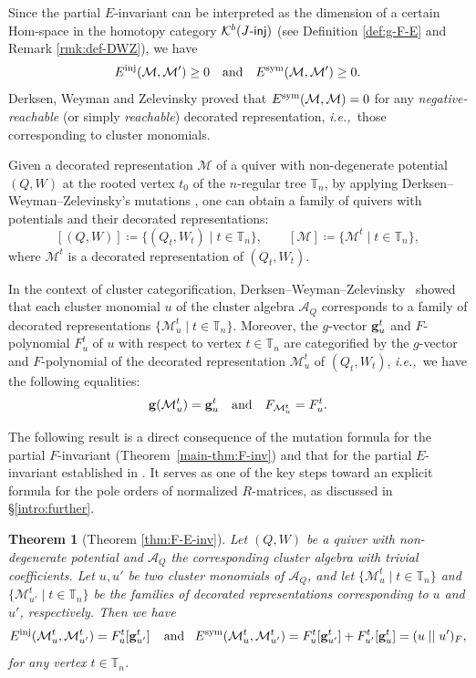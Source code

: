 \documentclass[12pt]{amsart}
\newtheorem{theorem}{Theorem}[section]
\theoremstyle{definition}
\theoremstyle{remark}
\numberwithin{equation}{section}
\newcommand{\ie}{\textit{i.e.,}\ }
\begin{document}
Since the partial $E$-invariant can be interpreted as the dimension of a certain Hom-space in the homotopy category $\mathcal K^{b}(J\mathchar`-\mathsf{inj})$ (see Definition \ref{def:g-F-E} and Remark \ref{rmk:def-DWZ}), we have \[E^{\rm inj}(\mathcal M,\mathcal M')\geq 0\quad \text{and}\quad E^{\rm sym}(\mathcal M,\mathcal M')\geq 0.\]
Derksen, Weyman and Zelevinsky  \cite[Corollary 7.2]{DWZ10} proved that  $E^{\rm sym}(\mathcal M,\mathcal M)=0$ for any {\em negative-reachable} (or simply {\em reachable}) decorated representation,  \ie those   corresponding to cluster monomials. 


Given a decorated representation $\mathcal M$ of a quiver with non-degenerate potential $(Q,W)$ at the rooted vertex $t_0$ of the $n$-regular tree $\mathbb T_n$, by applying Derksen--Weyman--Zelevinsky's mutations \cite{DWZ08}, one can obtain a family of quivers with potentials and their decorated representations:
 \[[(Q,W)]\coloneqq \{(Q_t,W_t)\mid t\in\mathbb T_n\},\quad\quad [\mathcal M]\coloneqq\{\mathcal M^t\mid t\in\mathbb T_n\},
 \]
 where $\mathcal M^t$ is a decorated representation of $(Q_t,W_t)$. 
 
In the context of cluster categorification, Derksen–Weyman–Zelevinsky~\cite{DWZ10} showed that  each cluster monomial $u$ of the cluster algebra $\mathcal A_Q$ corresponds to a family of decorated representations $\{\mathcal M_u^t\mid t\in\mathbb T_n\}$. Moreover, the $g$-vector ${\bf g}_u^t$ and $F$-polynomial $F_u^t$ of $u$ with respect to vertex $t\in\mathbb T_n$ are categorified by the $g$-vector and $F$-polynomial of the decorated representation $\mathcal M_u^t$ of $(Q_t, W_t)$, \ie we have the following equalities: 
\begin{eqnarray}\label{eqn:cat-g-f}
    {\bf g}(\mathcal M_u^t)={\bf g}_u^t\quad \text{and}\quad F_{\mathcal M_u^t}=F_u^t.
\end{eqnarray}


The following result is a direct consequence of the mutation formula for the partial $F$-invariant (Theorem~\ref{main-thm:F-inv}) and that for the partial $E$-invariant established in \cite[Theorem~7.1]{DWZ10}. It serves as one of the key steps toward an explicit formula for the pole orders of normalized $R$-matrices, as discussed in \S\ref{intro:further}.



 \begin{theorem}[{Theorem \ref{thm:F-E-inv}}] \label{main-thm:F-E-inv}
Let $(Q,W)$ be a quiver with non-degenerate potential and $\mathcal A_Q$ the corresponding cluster algebra with trivial coefficients. 
Let $u, u'$ be two cluster monomials of $\mathcal A_Q$, and let  $\{\mathcal M_u^t\mid t\in\mathbb T_n\}$ and $\{\mathcal M_{u'}^t\mid t\in\mathbb T_n\}$ be the families of decorated representations corresponding to $u$ and $u'$, respectively. Then we have
\[E^{\rm inj}(\mathcal M_u^t,\mathcal M_{u'}^t)=F_u^t[{\bf g}_{u'}^t]\;\;\;\;\text{and}\;\;\;E^{\rm sym}(\mathcal M_u^t,\mathcal M_{u'}^t)=F_u^t[{\bf g}_{u'}^t]+F_{u'}^t[{\bf g}_{u}^t]=(u\mid\mid u')_F,
\]
for any vertex $t\in\mathbb T_n$.
\end{theorem}
\end{document}
